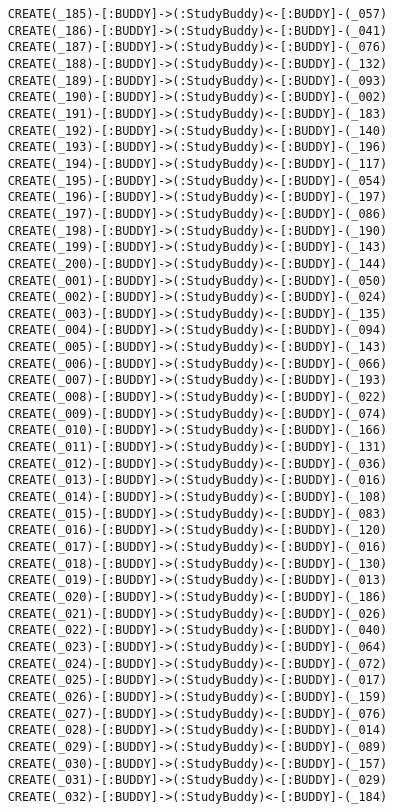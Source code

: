 \begin{lstlisting}
	CREATE(_185)-[:BUDDY]->(:StudyBuddy)<-[:BUDDY]-(_057)
	CREATE(_186)-[:BUDDY]->(:StudyBuddy)<-[:BUDDY]-(_041)
	CREATE(_187)-[:BUDDY]->(:StudyBuddy)<-[:BUDDY]-(_076)
	CREATE(_188)-[:BUDDY]->(:StudyBuddy)<-[:BUDDY]-(_132)
	CREATE(_189)-[:BUDDY]->(:StudyBuddy)<-[:BUDDY]-(_093)
	CREATE(_190)-[:BUDDY]->(:StudyBuddy)<-[:BUDDY]-(_002)
	CREATE(_191)-[:BUDDY]->(:StudyBuddy)<-[:BUDDY]-(_183)
	CREATE(_192)-[:BUDDY]->(:StudyBuddy)<-[:BUDDY]-(_140)
	CREATE(_193)-[:BUDDY]->(:StudyBuddy)<-[:BUDDY]-(_196)
	CREATE(_194)-[:BUDDY]->(:StudyBuddy)<-[:BUDDY]-(_117)
	CREATE(_195)-[:BUDDY]->(:StudyBuddy)<-[:BUDDY]-(_054)
	CREATE(_196)-[:BUDDY]->(:StudyBuddy)<-[:BUDDY]-(_197)
	CREATE(_197)-[:BUDDY]->(:StudyBuddy)<-[:BUDDY]-(_086)
	CREATE(_198)-[:BUDDY]->(:StudyBuddy)<-[:BUDDY]-(_190)
	CREATE(_199)-[:BUDDY]->(:StudyBuddy)<-[:BUDDY]-(_143)
	CREATE(_200)-[:BUDDY]->(:StudyBuddy)<-[:BUDDY]-(_144)
	CREATE(_001)-[:BUDDY]->(:StudyBuddy)<-[:BUDDY]-(_050)
	CREATE(_002)-[:BUDDY]->(:StudyBuddy)<-[:BUDDY]-(_024)
	CREATE(_003)-[:BUDDY]->(:StudyBuddy)<-[:BUDDY]-(_135)
	CREATE(_004)-[:BUDDY]->(:StudyBuddy)<-[:BUDDY]-(_094)
	CREATE(_005)-[:BUDDY]->(:StudyBuddy)<-[:BUDDY]-(_143)
	CREATE(_006)-[:BUDDY]->(:StudyBuddy)<-[:BUDDY]-(_066)
	CREATE(_007)-[:BUDDY]->(:StudyBuddy)<-[:BUDDY]-(_193)
	CREATE(_008)-[:BUDDY]->(:StudyBuddy)<-[:BUDDY]-(_022)
	CREATE(_009)-[:BUDDY]->(:StudyBuddy)<-[:BUDDY]-(_074)
	CREATE(_010)-[:BUDDY]->(:StudyBuddy)<-[:BUDDY]-(_166)
	CREATE(_011)-[:BUDDY]->(:StudyBuddy)<-[:BUDDY]-(_131)
	CREATE(_012)-[:BUDDY]->(:StudyBuddy)<-[:BUDDY]-(_036)
	CREATE(_013)-[:BUDDY]->(:StudyBuddy)<-[:BUDDY]-(_016)
	CREATE(_014)-[:BUDDY]->(:StudyBuddy)<-[:BUDDY]-(_108)
	CREATE(_015)-[:BUDDY]->(:StudyBuddy)<-[:BUDDY]-(_083)
	CREATE(_016)-[:BUDDY]->(:StudyBuddy)<-[:BUDDY]-(_120)
	CREATE(_017)-[:BUDDY]->(:StudyBuddy)<-[:BUDDY]-(_016)
	CREATE(_018)-[:BUDDY]->(:StudyBuddy)<-[:BUDDY]-(_130)
	CREATE(_019)-[:BUDDY]->(:StudyBuddy)<-[:BUDDY]-(_013)
	CREATE(_020)-[:BUDDY]->(:StudyBuddy)<-[:BUDDY]-(_186)
	CREATE(_021)-[:BUDDY]->(:StudyBuddy)<-[:BUDDY]-(_026)
	CREATE(_022)-[:BUDDY]->(:StudyBuddy)<-[:BUDDY]-(_040)
	CREATE(_023)-[:BUDDY]->(:StudyBuddy)<-[:BUDDY]-(_064)
	CREATE(_024)-[:BUDDY]->(:StudyBuddy)<-[:BUDDY]-(_072)
	CREATE(_025)-[:BUDDY]->(:StudyBuddy)<-[:BUDDY]-(_017)
	CREATE(_026)-[:BUDDY]->(:StudyBuddy)<-[:BUDDY]-(_159)
	CREATE(_027)-[:BUDDY]->(:StudyBuddy)<-[:BUDDY]-(_076)
	CREATE(_028)-[:BUDDY]->(:StudyBuddy)<-[:BUDDY]-(_014)
	CREATE(_029)-[:BUDDY]->(:StudyBuddy)<-[:BUDDY]-(_089)
	CREATE(_030)-[:BUDDY]->(:StudyBuddy)<-[:BUDDY]-(_157)
	CREATE(_031)-[:BUDDY]->(:StudyBuddy)<-[:BUDDY]-(_029)
	CREATE(_032)-[:BUDDY]->(:StudyBuddy)<-[:BUDDY]-(_184)

\end{lstlisting}
